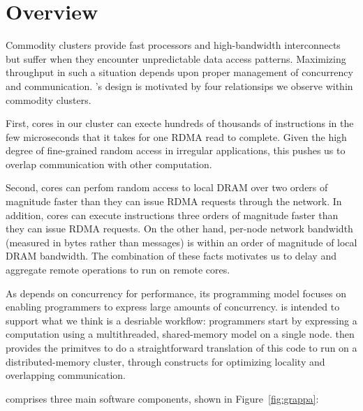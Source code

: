 \section{\Grappa Overview}

Commodity clusters provide fast processors and high-bandwidth
interconnects but suffer when they encounter unpredictable data access
patterns. Maximizing throughput in such a situation depends upon
proper management of concurrency and communication. \Grappa's design is
motivated by four relationsips we observe within commodity clusters.

First, cores in our cluster can execte hundreds of thousands of
instructions in the few microseconds that it takes for one RDMA read
to complete. Given the high degree of fine-grained random access in
irregular applications, this pushes us to overlap communication with
other computation.

Second, cores can perfom random access to local DRAM over two orders
of magnitude faster than they can issue RDMA requests through the
network. In addition, cores can execute instructions three orders of
magnitude faster than they can issue RDMA requests. On the other hand,
per-node network bandwidth (measured in bytes rather than messages) is
within an order of magnitude of local DRAM bandwidth. The combination
of these facts motivates us to delay and aggregate remote operations
to run on remote cores.

As \Grappa depends on concurrency for performance, its programming
model focuses on enabling programmers to express large amounts of
concurrency. \Grappa is intended to support what we think is a
desriable workflow: programmers start by expressing a computation
using a multithreaded, shared-memory model on a single node. \Grappa
then provides the primitves to do a straightforward translation of
this code to run on a distributed-memory cluster, through constructs
for optimizing locality and overlapping communication.

\Grappa comprises three main software components, shown in Figure~\ref{fig:grappa}:

